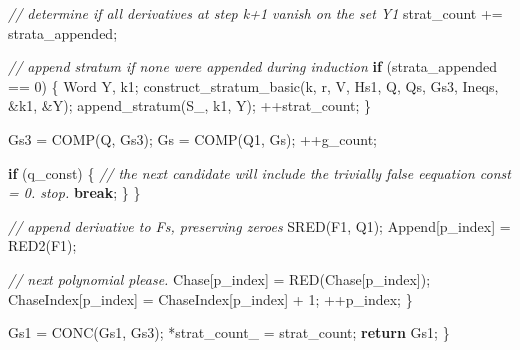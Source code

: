 \documentclass[
]{book}
\newenvironment{Shaded}{\begin{snugshade}}{\end{snugshade}}
\newcommand{\CommentTok}[1]{\textcolor[rgb]{0.56,0.35,0.01}{\textit{#1}}}
\newcommand{\ControlFlowTok}[1]{\textcolor[rgb]{0.13,0.29,0.53}{\textbf{#1}}}
\newcommand{\DecValTok}[1]{\textcolor[rgb]{0.00,0.00,0.81}{#1}}
\newcommand{\NormalTok}[1]{#1}
\theoremstyle{definition}
\theoremstyle{definition}
\theoremstyle{definition}
\theoremstyle{definition}
\theoremstyle{remark}
\begin{document}
\begin{Shaded}
\begin{Highlighting}[numbers=left,,]
            \CommentTok{// determine if all derivatives at step k+1 vanish on the set Y1}
\NormalTok{            strat\_count += strata\_appended;}

            \CommentTok{// append stratum if none were appended during induction}
            \ControlFlowTok{if}\NormalTok{ (strata\_appended == }\DecValTok{0}\NormalTok{) \{}
\NormalTok{                Word Y, k1;}
\NormalTok{                construct\_stratum\_basic(k, r, V, Hs1, Q, Qs, Gs3, Ineqs, \&k1, \&Y);}
\NormalTok{                append\_stratum(S\_, k1, Y);}
\NormalTok{                ++strat\_count;}
\NormalTok{            \}}

\NormalTok{            Gs3 = COMP(Q, Gs3);}
\NormalTok{            Gs = COMP(Q1, Gs);}
\NormalTok{            ++g\_count;}

            \ControlFlowTok{if}\NormalTok{ (q\_const) \{}
                \CommentTok{// the next candidate will include the trivially false eequation const = 0. stop.}
                \ControlFlowTok{break}\NormalTok{;}
\NormalTok{            \}}
\NormalTok{        \}}

        \CommentTok{// append derivative to Fs, preserving zeroes}
\NormalTok{        SRED(F1, Q1);}
\NormalTok{        Append[p\_index] = RED2(F1);}

        \CommentTok{// next polynomial please.}
\NormalTok{        Chase[p\_index] = RED(Chase[p\_index]);}
\NormalTok{        ChaseIndex[p\_index] = ChaseIndex[p\_index] + }\DecValTok{1}\NormalTok{;}
\NormalTok{        ++p\_index;}
\NormalTok{    \}}

\NormalTok{    Gs1 = CONC(Gs1, Gs3);}
\NormalTok{    *strat\_count\_ = strat\_count;}
    \ControlFlowTok{return}\NormalTok{ Gs1;}
\NormalTok{\}}
\end{Highlighting}
\end{Shaded}
\end{document}
